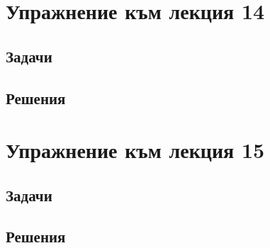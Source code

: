 \documentclass[a4paper,fleqn,12pt]{article}
\theoremstyle{definition}
\begin{document}
\section{Упражнение към лекция 14}

\subsection{Задачи}

\newpage
\subsection{Решения}

\newpage 
\section{Упражнение към лекция 15}

\subsection{Задачи}

\newpage
\subsection{Решения}
\end{document}
